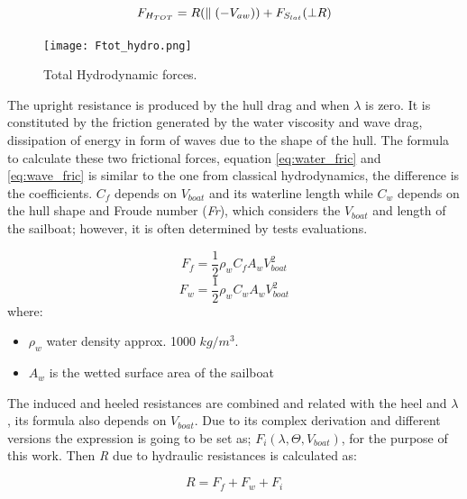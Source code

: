 
\begin{equation}
    F_{H_{TOT}}=R(\parallel( -V_{aw})) + F_{S_{lat}}(\bot R )\\
\end{equation}

\begin{figure}
    \centering
    \texttt{[image: Ftot\_hydro.png]}
    \caption{Total Hydrodynamic forces. \cite{fossati2009aero}}
    \label{fig:Ftot_hydro}
\end{figure}

The upright resistance is produced by the hull drag and when $\lambda$ is zero. It is constituted by the friction generated by the water viscosity and wave drag, dissipation of energy in form of waves due to the shape of the hull. The formula to calculate these two frictional forces, equation \ref{eq:water_fric} and \ref{eq:wave_fric} is similar to the one from classical hydrodynamics, the difference is the coefficients. $C_{f}$ depends on $V_{boat}$ and its waterline length while $C_{w}$ depends on the hull shape and Froude number (\textit{Fr}), which considers the $V_{boat}$ and length of the sailboat; however, it is often determined by tests evaluations.

\begin{equation}\label{eq:water_fric}
 F_{f}=\frac{1}{2}\rho_{w} C_{f} A_{w} V_{boat}^2
\end{equation}
\begin{equation}\label{eq:wave_fric}
 F_{w}=\frac{1}{2}\rho_{w} C_{w} A_{w} V_{boat}^2
\end{equation}
where:
\begin{itemize} \label{R_symbols}
    \item $\rho_{w}$ water density approx. 1000 $kg/m^3$.
    \item $A_{w}$ is the wetted surface area of the sailboat
\end{itemize}

The induced and heeled resistances are combined and related with the heel and $\lambda$, its formula also depends on $V_{boat}$. Due to its complex derivation and different versions the expression is going to be set as; $F_{i}(\lambda,\Theta,V_{boat})$, for the purpose of this work. Then \textit{R} due to hydraulic resistances is calculated as: \par 
\begin{equation} \label{eq:R_total}
    R=F_{f}+F_{w}+F_{i}
\end{equation}

